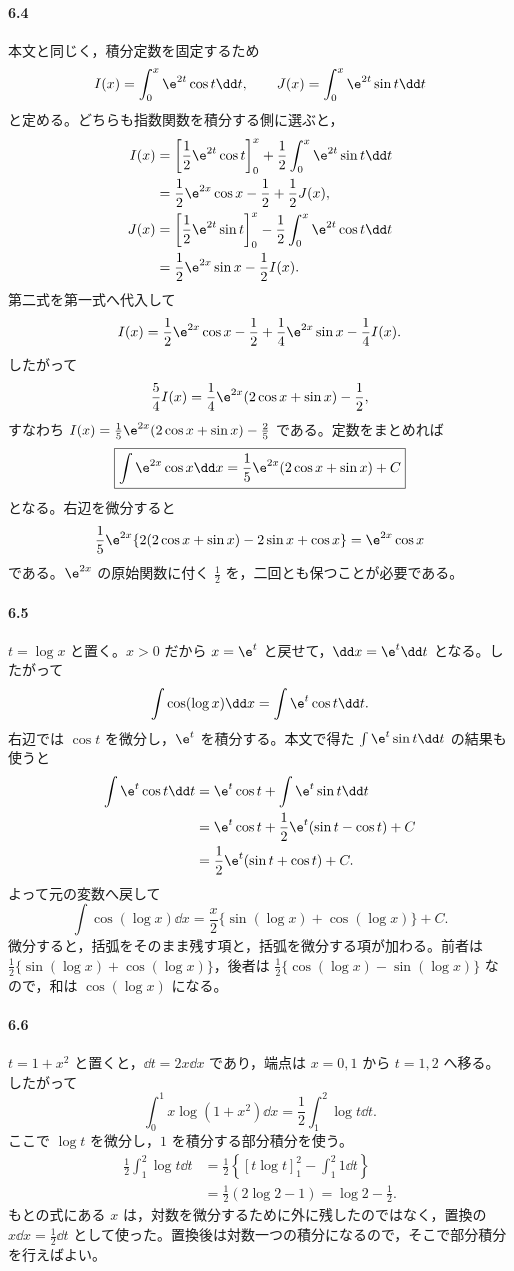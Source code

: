 \paragraph{6.4}
本文と同じく，積分定数を固定するため
\[
 I(x)=\int_0^x\e^{2t}\cos t\dd t,
 \qquad
 J(x)=\int_0^x\e^{2t}\sin t\dd t
\]
と定める。どちらも指数関数を積分する側に選ぶと，
\[
\begin{aligned}
 I(x)
 &=\left[\frac12\e^{2t}\cos t\right]_0^x
   +\frac12\int_0^x\e^{2t}\sin t\dd t\\
 &=\frac12\e^{2x}\cos x-\frac12+\frac12J(x),\\
 J(x)
 &=\left[\frac12\e^{2t}\sin t\right]_0^x
   -\frac12\int_0^x\e^{2t}\cos t\dd t\\
 &=\frac12\e^{2x}\sin x-\frac12I(x).
\end{aligned}
\]
第二式を第一式へ代入して
\[
 I(x)=\frac12\e^{2x}\cos x-\frac12
       +\frac14\e^{2x}\sin x-\frac14I(x).
\]
したがって
\[
 \frac54I(x)=\frac14\e^{2x}(2\cos x+\sin x)-\frac12,
\]
すなわち $I(x)=\frac15\e^{2x}(2\cos x+\sin x)-\frac25$ である。定数をまとめれば
\[
 \boxed{\int\e^{2x}\cos x\dd x
 =\frac15\e^{2x}(2\cos x+\sin x)+C}
\]
となる。右辺を微分すると
\[
 \frac15\e^{2x}
 \{2(2\cos x+\sin x)-2\sin x+\cos x\}
 =\e^{2x}\cos x
\]
である。$\e^{2x}$ の原始関数に付く $\frac12$ を，二回とも保つことが必要である。

\paragraph{6.5}
$t=\log x$ と置く。$x>0$ だから $x=\e^t$ と戻せて，$\dd x=\e^t\dd t$ となる。したがって
\[
 \int\cos(\log x)\dd x
 =\int\e^t\cos t\dd t.
\]
右辺では $\cos t$ を微分し，$\e^t$ を積分する。本文で得た $\int\e^t\sin t\dd t$ の結果も使うと
\[
\begin{aligned}
 \int\e^t\cos t\dd t
 &=\e^t\cos t+\int\e^t\sin t\dd t\\
 &=\e^t\cos t+\frac12\e^t(\sin t-\cos t)+C\\
 &=\frac12\e^t(\sin t+\cos t)+C.
\end{aligned}
\]
よって元の変数へ戻して
\[
 \int\cos(\log x)\dd x
 =\frac x2\{\sin(\log x)+\cos(\log x)\}+C.
\]
微分すると，括弧をそのまま残す項と，括弧を微分する項が加わる。前者は $\frac12\{\sin(\log x)+\cos(\log x)\}$，後者は $\frac12\{\cos(\log x)-\sin(\log x)\}$ なので，和は $\cos(\log x)$ になる。

\paragraph{6.6}
$t=1+x^2$ と置くと，$\dd t=2x\dd x$ であり，端点は $x=0,1$ から $t=1,2$ へ移る。したがって
\[
 \int_0^1x\log(1+x^2)\dd x
 =\frac12\int_1^2\log t\dd t.
\]
ここで $\log t$ を微分し，$1$ を積分する部分積分を使う。
\[
\begin{aligned}
 \frac12\int_1^2\log t\dd t
 &=\frac12\left\{[t\log t]_1^2-\int_1^2 1\dd t\right\}\\
 &=\frac12(2\log2-1)
 =\log2-\frac12.
\end{aligned}
\]
もとの式にある $x$ は，対数を微分するために外に残したのではなく，置換の $x\dd x=\frac12\dd t$ として使った。置換後は対数一つの積分になるので，そこで部分積分を行えばよい。

